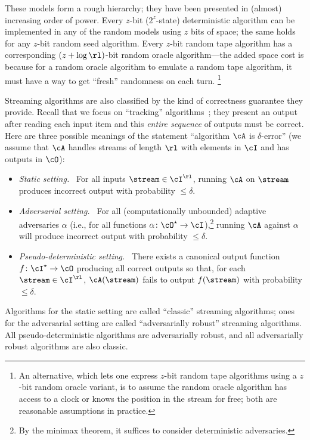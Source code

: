 \begin{itemize}
These models form a rough hierarchy; they have been presented in (almost)
increasing order of power. Every $z$-bit ($2^z$-state) deterministic algorithm
can be implemented in any of the random models using $z$ bits of space; the
same holds for any $z$-bit random seed algorithm.  Every $z$-bit random tape
algorithm has a corresponding $(z + \log\rl)$-bit random oracle
algorithm---the added space cost is because for a random oracle algorithm to
emulate a random tape algorithm, it must have a way to get ``fresh''
randomness on each turn.%
%
\footnote{An alternative, which lets one express $z$-bit random tape
algorithms using a $z$-bit random oracle variant, is to assume the random
oracle algorithm has access to a clock or knows the position in the stream for free;
both are reasonable assumptions in practice.}

Streaming algorithms are also classified by the kind of correctness guarantee
they provide. Recall that we focus on ``tracking''
algorithms~\cite{BenEliezerJWY20}; they present an output after reading each
input item and this {\em entire sequence} of outputs must be correct.  Here
are three possible meanings of the statement ``algorithm $\cA$ is
$\delta$-error'' (we assume that $\cA$ handles streams of length $\rl$ with
elements in $\cI$ and has outputs in $\cO$):

\iflipics\begin{itemize}\else
\begin{itemize}[left=2ex]\fi
  \item \emph{Static setting.~} For all inputs $\stream \in \cI^\rl$,
  running $\cA$ on $\stream$ produces incorrect output with probability $\le
  \delta$.
  \item \emph{Adversarial setting.~} For all (computationally unbounded)
  adaptive adversaries $\alpha$ (i.e., for all functions
  $\alpha \colon \cO^\star \to \cI$),\footnote{By the minimax
  theorem, it suffices to consider deterministic adversaries.} running $\cA$
  against $\alpha$ will produce incorrect output with probability $\le
  \delta$.
  \item \emph{Pseudo-deterministic setting.~} There exists a canonical output
  function $f \colon \cI^\star \rightarrow \cO$ producing all correct outputs
  so that, for each $\stream \in \cI^\rl$, $\cA(\stream)$ fails to output
  $f(\stream)$ with probability $\le \delta$.
\end{itemize}

Algorithms for the static setting are called ``classic'' streaming algorithms;
ones for the adversarial setting are called ``adversarially robust'' streaming
algorithms. All pseudo-deterministic algorithms are adversarially robust, and
all adversarially robust algorithms are also classic.


\end{itemize}
\end{itemize}
